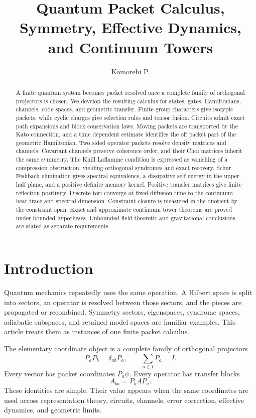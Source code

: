 \documentclass{aomart}
\title[Quantum packet calculus]{Quantum Packet Calculus, Symmetry, Effective Dynamics, and Continuum Towers}
\author[Komorebi P.]{Komorebi P.}
\theoremstyle{definition}
\theoremstyle{remark}
\begin{document}
\begin{abstract}
A finite quantum system becomes packet resolved once a complete family of orthogonal projectors is chosen. We develop the resulting calculus for states, gates, Hamiltonians, channels, code spaces, and geometric transfer. Finite group characters give isotypic packets, while cyclic charges give selection rules and tensor fusion. Circuits admit exact path expansions and block conservation laws. Moving packets are transported by the Kato connection, and a time dependent estimate identifies the off packet part of the geometric Hamiltonian. Two sided operator packets resolve density matrices and channels. Covariant channels preserve coherence order, and their Choi matrices inherit the same symmetry. The Knill Laflamme condition is expressed as vanishing of a compression obstruction, yielding orthogonal syndromes and exact recovery. Schur Feshbach elimination gives spectral equivalence, a dissipative self energy in the upper half plane, and a positive definite memory kernel. Positive transfer matrices give finite reflection positivity. Discrete tori converge at fixed diffusion time to the continuum heat trace and spectral dimension. Constraint closure is measured in the quotient by the constraint span. Exact and approximate continuum tower theorems are proved under bounded hypotheses. Unbounded field theoretic and gravitational conclusions are stated as separate requirements.
\end{abstract}
\maketitle
\thispagestyle{plain}

\section{Introduction}\label{sec:introduction}

Quantum mechanics repeatedly uses the same operation. A Hilbert space is split into sectors, an operator is resolved between those sectors, and the pieces are propagated or recombined. Symmetry sectors, eigenspaces, syndrome spaces, adiabatic subspaces, and retained model spaces are familiar examples. This article treats them as instances of one finite packet calculus.

The elementary coordinate object is a complete family of orthogonal projectors
\[
P_aP_b=\delta_{ab}P_a,
\qquad
\sum_{a\in I}P_a=I.
\]
Every vector has packet coordinates \(P_a\psi\). Every operator has transfer blocks
\[
A_{ba}=P_bAP_a.
\]
These identities are simple. Their value appears when the same coordinates are used across representation theory, circuits, channels, error correction, effective dynamics, and geometric limits.
\end{document}
